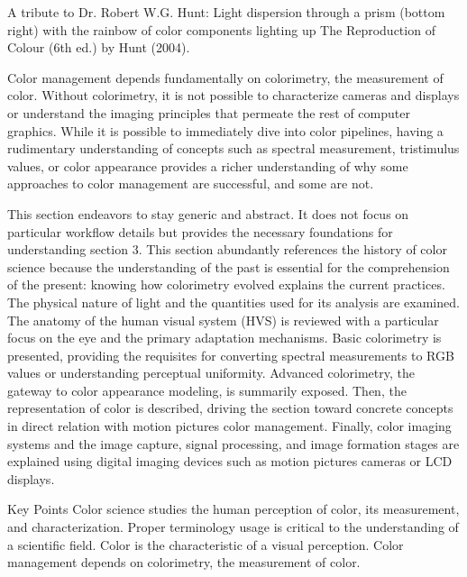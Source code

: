 A tribute to Dr. Robert W.G. Hunt: Light dispersion through a prism (bottom right) with the rainbow of color components lighting up The Reproduction of Colour (6th ed.) by Hunt (2004).

Color management depends fundamentally on colorimetry, the measurement of color. Without colorimetry, it is not possible to characterize cameras and displays or understand the imaging principles that permeate the rest of computer graphics. While it is possible to immediately dive into color pipelines, having a rudimentary understanding of concepts such as spectral measurement, tristimulus values, or color appearance provides a richer understanding of why some approaches to color management are successful, and some are not.

This section endeavors to stay generic and abstract. It does not focus on particular workflow details but provides the necessary foundations for understanding section 3. This section abundantly references the history of color science because the understanding of the past is essential for the comprehension of the present: knowing how colorimetry evolved explains the current practices. The physical nature of light and the quantities used for its analysis are examined. The anatomy of the human visual system (HVS) is reviewed with a particular focus on the eye and the primary adaptation mechanisms. Basic colorimetry is presented, providing the requisites for converting spectral measurements to RGB values or understanding perceptual uniformity. Advanced colorimetry, the gateway to color appearance modeling, is summarily exposed. Then, the representation of color is described, driving the section toward concrete concepts in direct relation with motion pictures color management. Finally, color imaging systems and the image capture, signal processing, and image formation stages are explained using digital imaging devices such as motion pictures cameras or LCD displays.

Key Points
Color science studies the human perception of color, its measurement, and characterization.
Proper terminology usage is critical to the understanding of a scientific field.
Color is the characteristic of a visual perception.
Color management depends on colorimetry, the measurement of color.













